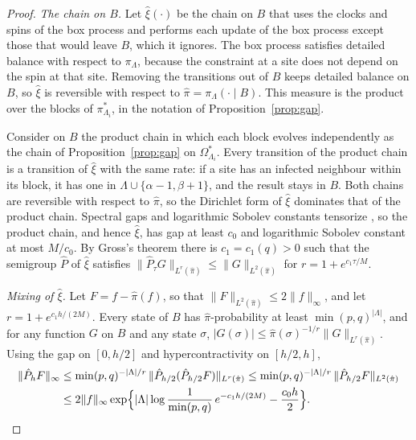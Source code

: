 \documentclass[11pt]{amsart}
\theoremstyle{definition}
\theoremstyle{remark}
\begin{document}
\begin{proof}
\emph{The chain on $B$.} Let $\hat\xi(\cdot)$ be the chain on $B$ that uses the clocks and spins of the box process and
performs each update of the box process except those that would leave $B$, which it ignores. The box process satisfies
detailed balance with respect to $\pi_\Lambda$, because the constraint at a site does not depend on the spin at that site.
Removing the transitions out of $B$ keeps detailed balance on $B$, so $\hat\xi$ is reversible with respect to
$\hat\pi=\pi_\Lambda(\cdot\mid B)$. This measure is the product over the blocks of $\pi^*_{\Lambda_i}$, in the notation of
Proposition~\ref{prop:gap}.

Consider on $B$ the product chain in which each block evolves independently as the chain of Proposition~\ref{prop:gap} on
$\Omega^*_{\Lambda_i}$. Every transition of the product chain is a transition of $\hat\xi$ with the same rate: if a site
has an infected neighbour within its block, it has one in $\Lambda\cup\{\alpha-1,\beta+1\}$, and the result stays in $B$. Both
chains are reversible with respect to $\hat\pi$, so the Dirichlet form of $\hat\xi$ dominates that of the product chain.
Spectral gaps and logarithmic Sobolev constants tensorize \cite{DSC96}, so the product chain, and hence $\hat\xi$, has
gap at least $c_0$ and logarithmic Sobolev constant at most $M/c_0$. By Gross's theorem \cite[Theorem~3.5]{DSC96} there is
$c_1=c_1(q)>0$ such that the semigroup $\hat P$ of $\hat\xi$ satisfies $\|\hat P_\tau G\|_{L^r(\hat\pi)}\le\|G\|_{L^2(\hat\pi)}$
for $r=1+e^{c_1\tau/M}$.

\emph{Mixing of $\hat\xi$.} Let $F=f-\hat\pi(f)$, so that $\|F\|_{L^2(\hat\pi)}\le2\|f\|_\infty$, and let $r=1+e^{c_1h/(2M)}$.
Every state of $B$ has $\hat\pi$-probability at least $\min(p,q)^{|\Lambda|}$, and for any function $G$ on $B$ and any
state $\sigma$, $|G(\sigma)|\le\hat\pi(\sigma)^{-1/r}\|G\|_{L^r(\hat\pi)}$. Using the gap on $[0,h/2]$ and hypercontractivity
on $[h/2,h]$,
\begin{align*}
\|\hat P_hF\|_\infty&\le\min(p,q)^{-|\Lambda|/r}\,\|\hat P_{h/2}(\hat P_{h/2}F)\|_{L^r(\hat\pi)}
\le\min(p,q)^{-|\Lambda|/r}\,\|\hat P_{h/2}F\|_{L^2(\hat\pi)}\\
&\le2\|f\|_\infty\exp\Bigl\{|\Lambda|\log\frac1{\min(p,q)}\,e^{-c_1h/(2M)}-\frac{c_0h}2\Bigr\}.
\end{align*}


\end{proof}
\end{document}

